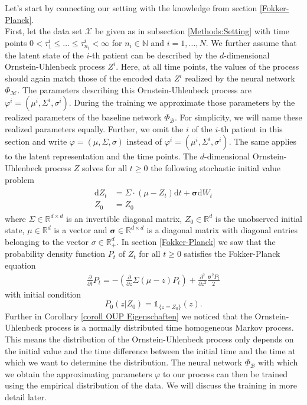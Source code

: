 \documentclass[11pt,titlepage]{article}
\newcommand{\R}{\mathbb{R}} %
\newcommand{\N}{\mathbb{N}} %
\theoremstyle{definition}
\theoremstyle{remark}
\begin{document}
	Let's start by connecting our setting with the knowledge from section \ref{Fokker-Planck}.\\
	First, let the data set $\mathcal{X}$ be given as in subsection \ref{Methods:Setting} with time points $0<\tau^i_1\leq \ldots\leq \tau^i_{n_i}<\infty$ for $n_i\in\N$ and $i=1,\ldots,N$. We further assume that the latent state of the $i$-th patient can be described by the $d$-dimensional Ornstein-Uhlenbeck process $Z^i$. Here, at all time points, the values of the process should again match those of the encoded data $Z^i$ realized by the neural network $\Phi_\mathcal{M}$. 
	The parameters describing this Ornstein-Uhlenbeck process are $\varphi^i = (\mu^i, \Sigma^i, \sigma^i)$. During the training we approximate those parameters by the realized parameters of the baseline network $\Phi_\mathcal{B}$. 
	For simplicity, we will name these realized parameters equally. Further, we omit the $i$ of the $i$-th patient in this section and write $\varphi = (\mu, \Sigma, \sigma)$ instead of $\varphi^i = (\mu^i, \Sigma^i, \sigma^i)$. The same applies to the latent representation and the time points. 
	The $d$-dimensional Ornstein-Uhlenbeck process $Z$ solves for all $t\geq 0$ the following stochastic initial value problem
	\begin{align*}
		\begin{split}
			\mathrm{d}Z_t &= \Sigma\cdot (\mu-Z_t)\mathrm{d}t +\boldsymbol{\sigma} \mathrm{d}W_t\\
			Z_0&=Z_0
		\end{split}
	\end{align*}
	where $\Sigma\in\R^{d\times d}$ is an invertible diagonal matrix, $Z_0\in\R^d$ is the unobserved initial state, $\mu\in\R^d$ is a vector and $\boldsymbol{\sigma}\in\R^{d\times d}$ is a diagonal matrix with diagonal entries belonging to the vector $\sigma\in\R_+^d$. In section \ref{Fokker-Planck} we saw that 
	the probability density function $P_t$ of $Z_t$ for all $t\geq 0$ satisfies the Fokker-Planck equation
	\begin{align}
		\frac{\partial}{\partial t}P_{t} = -\left(\frac{\partial}{\partial z}\Sigma(\mu-z)P_{t}\right) + \frac{\partial^2}{\partial z^2}\frac{\boldsymbol{\sigma}^2 P_{t}}{2}
		\label{Fokker-Planck Eq}
	\end{align}
	with initial condition
	\[P_0(z\vert Z_0)=\mathds{1}_{\{z=Z_0\}}(z).\]
	Further in Corollary \ref{coroll OUP Eigenschaften} we noticed that the Ornstein-Uhlenbeck process is a normally distributed time homogeneous Markov process. This means the distribution of the Ornstein-Uhlenbeck process only depends on the initial value and the time difference between the initial time and the time at which we want to determine the distribution. The neural network $\Phi_\mathcal{B}$ with which we obtain the approximating parameters $\varphi$ to our process can then be trained using the empirical distribution of the data. We will discuss the training in more detail later.
\end{document}
